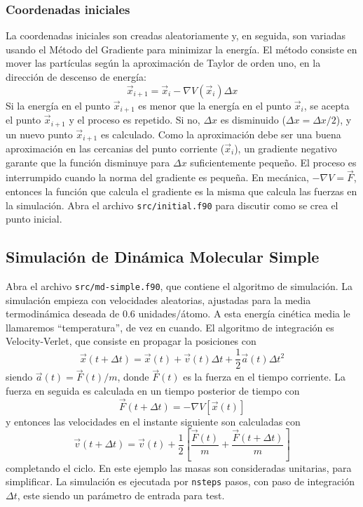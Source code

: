 \documentclass[10pt,a4paper,ssfamily]{exam}
\newcommand{\1}{{\bf 1}}
\newcommand{\2}{{\bf 2}}
\newcommand{\3}{{\bf 3}}
\begin{document}
\pagestyle{empty}
\sffamily
\noindent


\subsubsection*{Coordenadas iniciales}

La coordenadas iniciales son creadas aleatoriamente y, en seguida, son
variadas usando el Método del Gradiente para minimizar la energía. El
método consiste en mover las partículas según la aproximación de Taylor
de orden uno, en la dirección de descenso de energía:
\[
\vec{x}_{i+1} = \vec{x}_i - \nabla V(\vec{x}_i) \Delta x
\]  
Si la energía en el punto $\vec{x}_{i+1}$ es menor que la energía en el
punto $\vec{x}_i$, se acepta el punto $\vec{x}_{i+1}$ y el proceso es
repetido. Si no, $\Delta x$ es disminuido ($\Delta x = \Delta x / 2$), y
un nuevo punto $\vec{x}_{i+1}$ es calculado. Como la aproximación debe
ser una buena aproximación en las cercanias del punto corriente ($\vec{x}_i$), un
gradiente negativo garante que la función disminuye para $\Delta x$
suficientemente pequeño. El proceso es interrumpido cuando la norma del
gradiente es pequeña. En mecánica, $-\nabla V = \vec{F}$, entonces la
función que calcula el gradiente es la misma que calcula las fuerzas en
la simulación. Abra el archivo {\tt src/initial.f90} para
discutir como se crea el punto inicial. 

\subsection{Simulación de Dinámica Molecular Simple}

Abra el archivo {\tt src/md-simple.f90}, que contiene el algoritmo de
simulación. La simulación empieza con velocidades aleatorias, ajustadas
para la media termodinámica deseada de 0.6 unidades/átomo. A esta
energía cinética media le llamaremos ``temperatura'', de vez en cuando.
El algoritmo de integración es Velocity-Verlet, que consiste en propagar
la posiciones con
\[
\vec{x}(t+\Delta t) = \vec{x}(t) + \vec{v}(t)\Delta t + \frac{1}{2}\vec{a}(t)\Delta t^2
\]   
siendo $\vec{a}(t)=\vec{F}(t)/m$, donde $\vec{F}(t)$ es la fuerza en el tiempo corriente. 
La fuerza en seguida es calculada en un tiempo posterior de tiempo con
\[
\vec{F}(t+\Delta t) = -\nabla V[\vec{x}(t)]
\]
y entonces las velocidades en el instante siguiente son calculadas con
\[
\vec{v}(t+\Delta t) = \vec{v}(t) +
\frac{1}{2}\left[
\frac{\vec{F}(t)}{m}+\frac{\vec{F}(t+\Delta t)}{m}\right]
\]
completando el ciclo. En este ejemplo las masas son consideradas
unitarias, para simplificar. La simulación es ejecutada por {\tt nsteps}
pasos, con paso de integración $\Delta t$, este siendo un parámetro de
entrada para test. 
\end{document}
